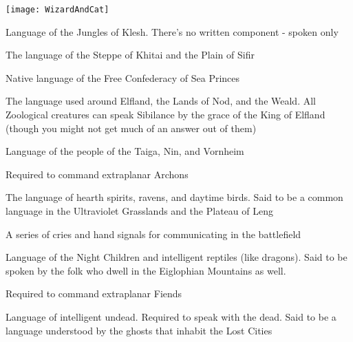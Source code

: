 {  \begin{center}
  \texttt{[image: WizardAndCat]}
  \end{center}

  \cbreak


  Language of the Jungles of Klesh. There's no written component - spoken only


  The language of the Steppe of Khitai and the Plain of Sifir


  Native language of the Free Confederacy of Sea Princes


  The language used around Elfland, the Lands of Nod, and the Weald.  All Zoological creatures can speak Sibilance by the grace of the King of Elfland (though you might not get much of an answer out of them)


  Language of the people of the Taiga, Nin, and Vornheim




Required to command extraplanar Archons


The language of hearth spirits, ravens, and daytime birds.  Said to be a common language in the Ultraviolet Grasslands and the Plateau of Leng


A series of cries and hand signals for communicating in the battlefield


Language of the Night Children and intelligent reptiles (like dragons).  Said to be spoken by the folk who dwell in the Eiglophian Mountains as well.


Required to command extraplanar Fiends


Language of intelligent undead.   Required to speak with the dead.  Said to be a language understood by the ghosts that inhabit the Lost Cities

}
